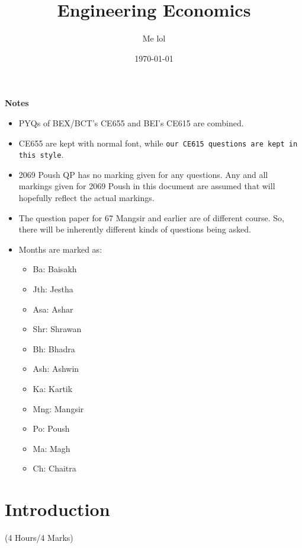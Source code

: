 \documentclass[12pt]{article}
\title{Engineering Economics}
\author{Me lol}
\date{\today}
\begin{document}
\maketitle
\vspace{9cm}
\begin{large}\textbf{Notes}\end{large}
\begin{itemize}[noitemsep]
\item PYQs of BEX/BCT's CE655 and BEI's CE615 are combined.
\item CE655 are kept with normal font, while \texttt{our CE615 questions are kept in this style}.
\item 2069 Poush QP has no marking given for any questions. Any and all markings given for 2069 Poush in this document are assumed that will hopefully reflect the actual markings.
\item The question paper for 67 Mangsir and earlier are of different course. So, there will be inherently different kinds of questions being asked.
\item Months are marked as: 
\begin{itemize}[noitemsep]
	\item Ba: Baisakh
	\item Jth: Jestha
	\item Asa: Ashar
	\item Shr: Shrawan
	\item Bh: Bhadra
	\item Ash: Ashwin
	\item Ka: Kartik
	\item Mng: Mangsir
	\item Po: Poush
	\item Ma: Magh
	\item Ch: Chaitra
\end{itemize}
\end{itemize}
\pagebreak
\tableofcontents
\pagebreak

\section{Introduction}
	\begin{center}(4 Hours/4 Marks)\end{center}
\end{document}
